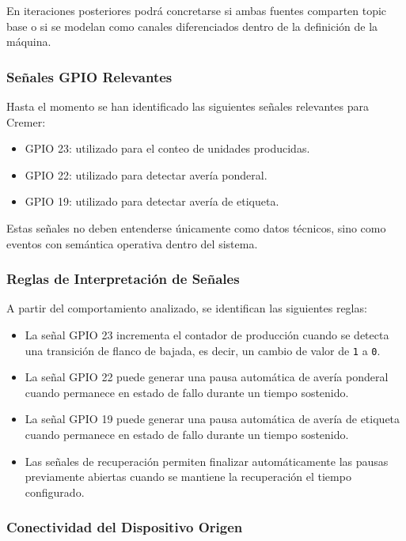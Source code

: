 En iteraciones posteriores podrá concretarse si ambas fuentes comparten topic base o si se modelan como canales diferenciados dentro de la definición de la máquina.

\subsubsection{Señales GPIO Relevantes}

Hasta el momento se han identificado las siguientes señales relevantes para Cremer:

\begin{itemize}
    \item GPIO 23: utilizado para el conteo de unidades producidas.
    \item GPIO 22: utilizado para detectar avería ponderal.
    \item GPIO 19: utilizado para detectar avería de etiqueta.
\end{itemize}

Estas señales no deben entenderse únicamente como datos técnicos, sino como eventos con semántica operativa dentro del sistema.

\subsubsection{Reglas de Interpretación de Señales}

A partir del comportamiento analizado, se identifican las siguientes reglas:

\begin{itemize}
    \item La señal GPIO 23 incrementa el contador de producción cuando se detecta una transición de flanco de bajada, es decir, un cambio de valor de \texttt{1} a \texttt{0}.
    \item La señal GPIO 22 puede generar una pausa automática de avería ponderal cuando permanece en estado de fallo durante un tiempo sostenido.
    \item La señal GPIO 19 puede generar una pausa automática de avería de etiqueta cuando permanece en estado de fallo durante un tiempo sostenido.
    \item Las señales de recuperación permiten finalizar automáticamente las pausas previamente abiertas cuando se mantiene la recuperación el tiempo configurado.
\end{itemize}

\subsubsection{Conectividad del Dispositivo Origen}

